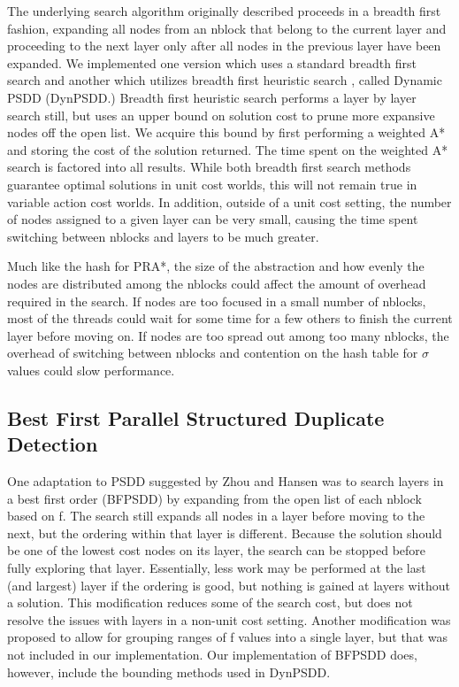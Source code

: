 \documentclass{article}
\begin{document}
The underlying search algorithm originally described proceeds in a breadth first fashion, expanding all nodes from an nblock that belong to the current layer and proceeding to the next layer only after all nodes in the previous layer have been expanded. We implemented one version which uses a standard breadth first search and another which utilizes breadth first heuristic search \cite{zhou:bhs}, called Dynamic PSDD (DynPSDD.) Breadth first heuristic search performs a layer by layer search still, but uses an upper bound on solution cost to prune more expansive nodes off the open list. We acquire this bound by first performing a weighted A* and storing the cost of the solution returned. The time spent on the weighted A* search is factored into all results. While both breadth first search methods guarantee optimal solutions in unit cost worlds, this will not remain true in variable action cost worlds. In addition, outside of a unit cost setting, the number of nodes assigned to a given layer can be very small, causing the time spent switching between nblocks and layers to be much greater.

Much like the hash for PRA*, the size of the abstraction and how evenly the nodes are distributed among the nblocks could affect the amount of overhead required in the search. If nodes are too focused in a small number of nblocks, most of the threads could wait for some time for a few others to finish the current layer before moving on. If nodes are too spread out among too many nblocks, the overhead of switching between nblocks and contention on the hash table for $\sigma$ values could slow performance.
\subsection{Best First Parallel Structured Duplicate Detection}
One adaptation to PSDD suggested by Zhou and Hansen was to search layers in a best first order \cite{zhou:sdd} (BFPSDD) by expanding from the open list of each nblock based on f. The search still expands all nodes in a layer before moving to the next, but the ordering within that layer is different. Because the solution should be one of the lowest cost nodes on its layer, the search can be stopped before fully exploring that layer. Essentially, less work may be performed at the last (and largest) layer if the ordering is good, but nothing is gained at layers without a solution. This modification reduces some of the search cost, but does not resolve the issues with layers in a non-unit cost setting. Another modification was proposed to allow for grouping ranges of f values into a single layer, but that was not included in our implementation. Our implementation of BFPSDD does, however, include the bounding methods used in DynPSDD.
\end{document}
